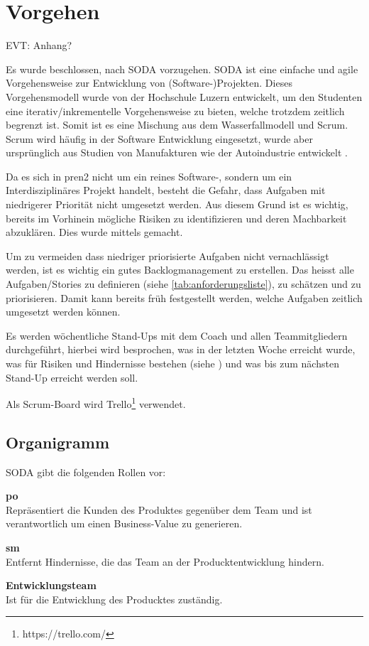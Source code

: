 \newpage
\section{Vorgehen}

EVT: Anhang?

Es wurde beschlossen, nach SODA \cite{HSLU-Education-SODA} vorzugehen.
SODA ist eine einfache und agile Vorgehensweise zur Entwicklung von (Software-)Projekten. Dieses Vorgehensmodell wurde von der Hochschule Luzern entwickelt, um den Studenten eine iterativ/inkrementelle Vorgehensweise zu bieten, welche trotzdem zeitlich begrenzt ist. Somit ist es eine Mischung aus dem Wasserfallmodell und Scrum. Scrum wird häufig in der Software Entwicklung eingesetzt, wurde aber ursprünglich aus Studien von Manufakturen wie der Autoindustrie entwickelt \cite{Wikipedia-Scrum-History}.

Da es sich in \acrshort{pren2} nicht um ein reines Software-, sondern um
ein Interdisziplinäres Projekt handelt, besteht die Gefahr, dass Aufgaben
mit niedrigerer Priorität nicht umgesetzt werden. Aus diesem Grund ist es
wichtig, bereits im Vorhinein mögliche Risiken zu identifizieren und deren Machbarkeit
abzuklären. Dies wurde mittels  gemacht.

Um zu vermeiden dass niedriger priorisierte Aufgaben nicht vernachlässigt werden,
ist es wichtig ein gutes Backlogmanagement zu erstellen. Das heisst alle Aufgaben/Stories zu definieren (siehe \ref{tab:anforderungsliste}), zu schätzen und zu priorisieren. Damit kann bereits früh festgestellt werden, welche Aufgaben zeitlich umgesetzt werden können.

Es werden wöchentliche Stand-Ups mit dem Coach und allen Teammitgliedern durchgeführt, hierbei wird besprochen, was in der letzten Woche erreicht wurde, was für Risiken und Hindernisse bestehen (siehe ) und was bis zum nächsten Stand-Up erreicht werden soll.

Als Scrum-Board wird Trello\footnote{https://trello.com/} verwendet.

\newpage

\subsection{Organigramm}
SODA gibt die folgenden Rollen vor:

\begin{items}
  \item {\bf \acrfull{po}} \\
    Repräsentiert die Kunden des Produktes gegenüber dem Team 
    und ist verantwortlich um einen Business-Value zu generieren.
  \item {\bf \acrfull{sm}} \\
    Entfernt Hindernisse, die das Team an der Producktentwicklung hindern.
  \item {\bf Entwicklungsteam} \\
    Ist für die Entwicklung des Producktes zuständig.
\end{items}

